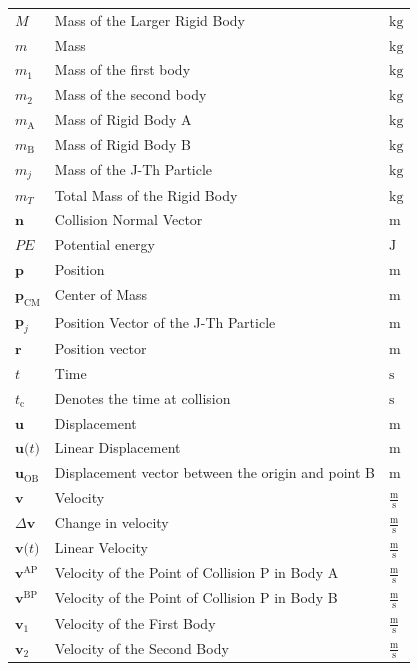 \documentclass[12pt]{article}
\begin{document}
\begin{longtabu}{l X[l] l}
$M$ & Mass of the Larger Rigid Body & ${\text{kg}}$
\\
$m$ & Mass & ${\text{kg}}$
\\
${m_{1}}$ & Mass of the first body & ${\text{kg}}$
\\
${m_{2}}$ & Mass of the second body & ${\text{kg}}$
\\
${m_{\text{A}}}$ & Mass of Rigid Body A & ${\text{kg}}$
\\
${m_{\text{B}}}$ & Mass of Rigid Body B & ${\text{kg}}$
\\
${m_{j}}$ & Mass of the J-Th Particle & ${\text{kg}}$
\\
${m_{T}}$ & Total Mass of the Rigid Body & ${\text{kg}}$
\\
$\mathbf{n}$ & Collision Normal Vector & ${\text{m}}$
\\
$PE$ & Potential energy & ${\text{J}}$
\\
$\mathbf{p}$ & Position & ${\text{m}}$
\\
${\mathbf{p}_{\text{CM}}}$ & Center of Mass & ${\text{m}}$
\\
${\mathbf{p}_{j}}$ & Position Vector of the J-Th Particle & ${\text{m}}$
\\
$\mathbf{r}$ & Position vector & ${\text{m}}$
\\
$t$ & Time & ${\text{s}}$
\\
${t_{\text{c}}}$ & Denotes the time at collision & ${\text{s}}$
\\
$\mathbf{u}$ & Displacement & ${\text{m}}$
\\
$\mathbf{u}\text{(}t\text{)}$ & Linear Displacement & ${\text{m}}$
\\
${\mathbf{u}_{\text{O}\text{B}}}$ & Displacement vector between the origin and point B & ${\text{m}}$
\\
$\mathbf{v}$ & Velocity & $\frac{\text{m}}{\text{s}}$
\\
$Δ\mathbf{v}$ & Change in velocity & $\frac{\text{m}}{\text{s}}$
\\
$\mathbf{v}\text{(}t\text{)}$ & Linear Velocity & $\frac{\text{m}}{\text{s}}$
\\
${\mathbf{v}^{\text{A}\text{P}}}$ & Velocity of the Point of Collision P in Body A & $\frac{\text{m}}{\text{s}}$
\\
${\mathbf{v}^{\text{B}\text{P}}}$ & Velocity of the Point of Collision P in Body B & $\frac{\text{m}}{\text{s}}$
\\
${\mathbf{v}_{1}}$ & Velocity of the First Body & $\frac{\text{m}}{\text{s}}$
\\
${\mathbf{v}_{2}}$ & Velocity of the Second Body & $\frac{\text{m}}{\text{s}}$

\end{longtabu}
\end{document}
